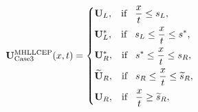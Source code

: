 \documentclass[review]{elsarticle}
\begin{document}

 \begin{equation}\label{eq:HLLCEP3}
   \mathbf{U}^{\text{MHLLCEP}}_{\text{Case3}}(x,t) = \left\{ \begin{aligned}
        & \mathbf{U}_L, \hspace{0.3cm} \text{if} \hspace{0.3cm} \frac{x}{t}\le s_L, \\
        & \mathbf{U}_L^*, \hspace{0.3cm} \text{if} \hspace{0.3cm} s_L \le \frac{x}{t} \le s^*, \\
        & \mathbf{U}_R^*, \hspace{0.3cm} \text{if} \hspace{0.3cm} s^*\le \frac{x}{t} \le s_R, \\
        & \widetilde{\mathbf{U}}_R, \hspace{0.3cm} \text{if} \hspace{0.3cm} s_R \le \frac{x}{t} \le \widetilde{s}_R,\\
        & \mathbf{U}_R, \hspace{0.3cm} \text{if} \hspace{0.3cm} \frac{x}{t}\ge \widetilde{s}_R, \\
      \end{aligned}
    \right.
  \end{equation}
\end{document}
